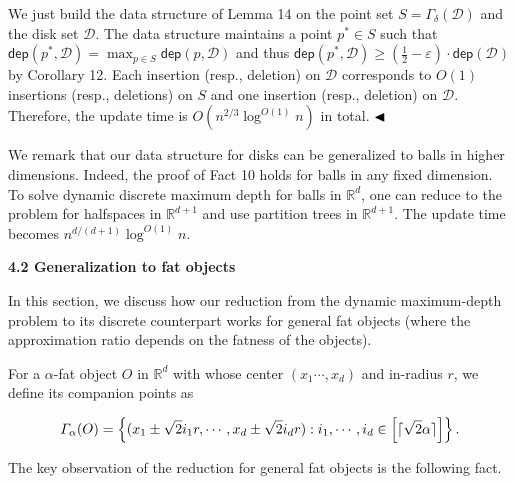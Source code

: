 \documentclass[10pt,a4paper]{article}
\begin{document}
We just build the data structure of Lemma 14 on the point set $S=\varGamma_{\delta}(\mathcal{D})$ and the disk set $\mathcal{D}$. The data structure maintains a point $p^{*}\in S$ such that $\mathsf{dep}(p^{*},\mathcal{D})=\max_{p\in S}\mathsf{dep}(p,\mathcal{D})$ and thus $\mathsf{dep}(p^{*},\mathcal{D})\geq(\frac{1}{2}-\varepsilon)\cdot\mathsf{dep}(%
\mathcal{D})$ by Corollary 12. Each insertion (resp., deletion) on $\mathcal{D}$ corresponds to $O(1)$ insertions (resp., deletions) on $S$ and one insertion (resp., deletion) on $\mathcal{D}$. Therefore, the update time is $O(n^{2/3}\log^{O(1)}{n})$ in total. $\hfill\blacktriangleleft$
\par
\par
We remark that our data structure for disks can be generalized to balls in higher dimensions. Indeed, the proof of Fact 10 holds for balls in any fixed dimension. To solve dynamic discrete maximum depth for balls in $\mathbb{R}^{d}$, one can reduce to the problem for halfspaces in $\mathbb{R}^{d+1}$ and use partition trees in $\mathbb{R}^{d+1}$. The update time becomes $n^{d/(d+1)}\log^{O(1)}n$.
\par
\par
\par\medskip\noindent\textbf{4.2 Generalization to fat objects}\par
In this section, we discuss how our reduction from the dynamic maximum-depth problem to its discrete counterpart works for general fat objects (where the approximation ratio depends on the fatness of the objects).
\par
\par
For a $\alpha$-fat object $O$ in $\mathbb{R}^{d}$ with whose center $(x_{1}\cdots,x_{d})$ and in-radius $r$, we define its companion points as
\par
\[\begin{aligned}
\varGamma_{\alpha}(O)=\left\{(x_{1}\pm\sqrt{2}i_{1}r,\cdots,x_{d}\pm\sqrt{2}i_%
{d}r):i_{1},\cdots,i_{d}\in\left[\lceil\sqrt{2}\alpha\rceil\right]\right\}.
\end{aligned}\]
\par
The key observation of the reduction for general fat objects is the following fact.
\par
\par
\end{document}
